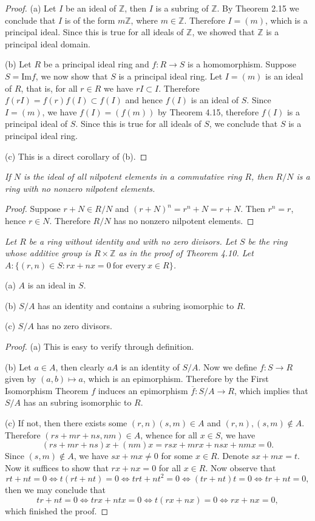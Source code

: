 \begin{proof}
(a) Let $I$ be an ideal of $\mathbb{Z}$, then $I$ is a subring of $\mathbb{Z}$. By Theorem 2.15 we conclude that $I$ is of the form $m\mathbb{Z}$, where $m\in\mathbb{Z}$. Therefore $I=(m)$, which is a principal ideal. Since this is true for all ideals of $\mathbb{Z}$, we showed that $\mathbb{Z}$ is a principal ideal domain.\par
(b) Let $R$ be a principal ideal ring and $f:R\to S$ is a homomorphism. Suppose $S=\mathrm{Im}f$, we now show that $S$ is a principal ideal ring. Let $I=(m)$ is an ideal of $R$, that is, for all $r\in R$ we have $rI\subset I$. Therefore $f(rI)=f(r)f(I)\subset f(I)$ and hence $f(I)$ is an ideal of $S$. Since $I=(m)$, we have $f(I)=(f(m))$ by Theorem 4.15, therefore $f(I)$ is a principal ideal of $S$. Since this is true for all ideals of $S$, we conclude that $S$ is a principal ideal ring.\par
(c) This is a direct corollary of (b).
\end{proof}
\begin{problem}\em
If $N$ is the ideal of all nilpotent elements in a commutative ring $R$, then $R/N$ is a ring with no nonzero nilpotent elements.
\end{problem}
\begin{proof}
Suppose $r+N\in R/N$ and $(r+N)^n=r^n+N=r+N$. Then $r^n=r$, hence $r\in N$. Therefore $R/N$ has no nonzero nilpotent elements.
\end{proof}
\begin{problem}\em
Let $R$ be a ring without identity and with no zero divisors. Let $S$ be the ring whose additive group is $R\times\mathbb{Z}$ as in the proof of Theorem 4.10. Let $A:\{(r,n)\in S:rx+nx=0\ \text{for every}\ x\in R\}$.\par
(a) $A$ is an ideal in $S$.\par
(b) $S/A$ has an identity and contains a subring isomorphic to $R$.\par
(c) $S/A$ has no zero divisors.
\end{problem}
\begin{proof}
(a) This is easy to verify through definition.\par
(b) Let $a\in A$, then clearly $aA$ is an identity of $S/A$. Now we define $f:S\to R$ given by $(a,b)\mapsto a$, which is an epimorphism. Therefore by the First Isomorphism Theorem $f$ induces an epimorphism $\overline{f}:S/A\to R$, which implies that $S/A$ has an subring isomorphic to $R$.\par
(c) If not, then there exists some $(r,n)(s,m)\in A$ and $(r,n),(s,m)\notin A$. Therefore $(rs+mr+ns,nm)\in A$, whence for all $x\in S$, we have 
$$(rs+mr+ns)x+(nm)x=rsx+mrx+nsx+nmx=0.$$
Since $(s,m)\notin A$, we have $sx+mx\ne 0$ for some $x\in R$. Denote $sx+mx=t$. Now it suffices to show that $rx+nx=0$ for all $x\in R$. Now observe that 
$$rt+nt=0\Leftrightarrow t(rt+nt)=0\Leftrightarrow trt+nt^2=0\Leftrightarrow (tr+nt)t=0\Leftrightarrow tr+nt=0,$$
then we may conclude that 
$$tr+nt=0\Leftrightarrow trx+ntx=0\Leftrightarrow t(rx+nx)=0\Leftrightarrow rx+nx=0,$$
which finished the proof.
\end{proof}
